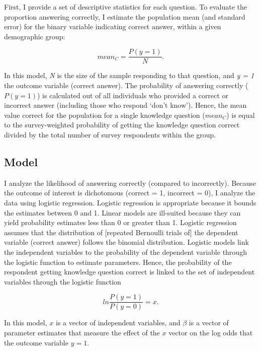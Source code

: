 \documentclass[11pt]{article}
\begin{document}
First, I provide a set of descriptive statistics for each question. To evaluate the proportion answering correctly, I estimate the population mean (and standard error) for the binary variable indicating correct answer, within a given demographic group:

 $$ mean_C = \frac{P(y = 1)}{N}. $$

In this model, \emph{N} is the size of the sample responding to that question, and \emph{y = 1} the outcome variable (correct answer). The probability of answering correctly ($P(y = 1)$) is calculated out of all individuals who provided a correct or incorrect answer (including those who respond `don't know'). Hence, the mean value correct for the population for a single knowledge question ($mean_C$) is equal to the survey-weighted probability of getting the knowledge question correct divided by the total number of survey respondents within the group.


\subsection{Model}\label{sec:model}

I analyze the likelihood of answering correctly (compared to incorrectly). Because the outcome of interest is dichotomous (correct = 1, incorrect = 0), I analyze the data using logistic regression. Logistic regression is appropriate because it bounds the estimates between 0 and 1. Linear models are ill-suited  because they can yield probability estimates less than 0 or greater than 1. Logistic regression assumes that the distribution of [repeated Bernoulli trials of] the dependent variable (correct answer) follows the binomial distribution. Logistic models link the independent variables to the probability of the dependent variable through the logistic function to estimate parameters. Hence, the probability of the respondent getting knowledge question correct is linked to the set of independent variables through the logistic function

 $$ ln \frac{P(y=1)}{P(y=0)}=x. $$

In this model, $x$ is a vector of independent variables, and $\beta$ is a vector of parameter estimates that measure the effect of the $x$ vector on the log odds that the outcome variable $y = 1$.


\end{document}
